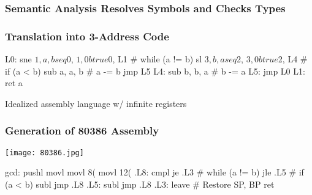 \documentclass{plt}
\begin{document}
\renewcommand{\id}[1]{
  node [fill=white] (id) {#1}
  (id) .. controls +(-1,-2) and +(1,0) .. (#1.east)
}

\begin{frame}
  \frametitle{Semantic Analysis Resolves Symbols and Checks Types}


\end{frame}


\begin{frame}[fragile]
  \frametitle{Translation into 3-Address Code}

\begin{assembly}
L0: sne   $1,  a, b
    seq   $0, $1, 0
    btrue $0, L1    # while (a != b)
    sl    $3,  b, a
    seq   $2, $3, 0
    btrue $2, L4    # if (a < b)
    sub   a,   a, b # a -= b
    jmp   L5
L4: sub   b,   b, a # b -= a
L5: jmp   L0
L1: ret    a
\end{assembly}

\usebox{\gcdbox}\hfill\parbox{14pc}{\raggedright
Idealized assembly language w/ infinite registers
}

%
%

\end{frame}


\begin{frame}[fragile]
  \frametitle{Generation of 80386 Assembly}

\hfill \texttt{[image: 80386.jpg]}

\begin{assembly}
gcd:  pushl %
      movl  %
      movl  8(%
      movl  12(%
.L8:  cmpl  %
      je    .L3           # while (a != b)
      jle   .L5           # if (a < b)
      subl  %
      jmp   .L8
.L5:  subl  %
      jmp   .L8
.L3:  leave               # Restore SP, BP
      ret
\end{assembly}

\end{frame}
\end{document}
